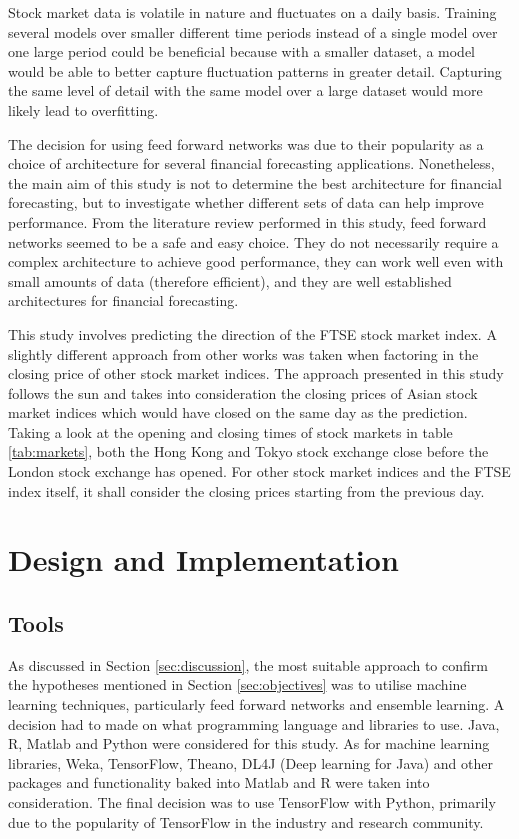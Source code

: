 \documentclass{UoYCSproject}
\begin{document}
Stock market data is volatile in nature and fluctuates on a daily basis. Training several models over smaller different time periods instead of a single model over one large period could be beneficial because with a smaller dataset, a model would be able to better capture fluctuation patterns in greater detail. Capturing the same level of detail with the same model over a large dataset would more likely lead to overfitting. 

The decision for using feed forward networks was due to their popularity as a choice of architecture for several financial forecasting applications. Nonetheless, the main aim of this study is not to determine the best architecture for financial forecasting, but to investigate whether different sets of data can help improve performance. From the literature review performed in this study, feed forward networks seemed to be a safe and easy choice. They do not necessarily require a complex architecture to achieve good performance, they can work well even with small amounts of data (therefore efficient), and they are well established architectures for financial forecasting.    

This study involves predicting the direction of the FTSE stock market index. A slightly different approach from other works was taken when factoring in the closing price of other stock market indices. The approach presented in this study follows the sun and takes into consideration the closing prices of Asian stock market indices which would have closed on the same day as the prediction. Taking a look at the opening and closing times of stock markets in table \ref{tab:markets}, both the Hong Kong and Tokyo stock exchange close before the London stock exchange has opened. For other stock market indices and the FTSE index itself, it shall consider the closing prices starting from the previous day.       

\chapter{Design and Implementation}
\label{cha:implementation}
\section{Tools}
As discussed in Section \ref{sec:discussion}, the most suitable approach to confirm the hypotheses mentioned in Section \ref{sec:objectives} was to utilise machine learning techniques, particularly feed forward networks and ensemble learning. A decision had to made on what programming language and libraries to use. Java, R, Matlab and Python were considered for this study. As for machine learning libraries, Weka, TensorFlow, Theano, DL4J (Deep learning for Java) and other packages and functionality baked into Matlab and R were taken into consideration. The final decision was to use TensorFlow with Python, primarily due to the popularity of TensorFlow in the industry and research community. 
\end{document}
